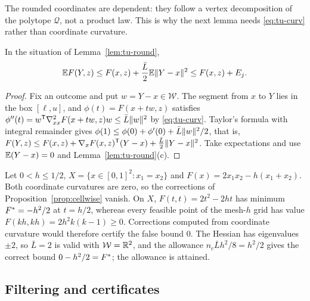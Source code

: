 The rounded coordinates are dependent: they follow a vertex decomposition of
the polytope $\mathcal Q$, not a product law. This is why the next lemma needs
\eqref{eq:tu-curv} rather than coordinate curvature.

\begin{lemma}\label{lem:tu-allow}
In the situation of Lemma~\ref{lem:tu-round},
\[
\mathbb E F(Y,z)\le F(x,z)+\frac{\bar L}2\mathbb E\lVert Y-x\rVert^2\le F(x,z)+E_j .
\]
\end{lemma}

\begin{proof}
Fix an outcome and put $w=Y-x\in\mathcal W$. The segment from $x$ to $Y$ lies
in the box $[\ell,u]$, and $\phi(t)=F(x+tw,z)$ satisfies
$\phi''(t)=w^{\mathsf T}\nabla^2_{xx}F(x+tw,z)w\le\bar L\lVert w\rVert^2$ by
\eqref{eq:tu-curv}. Taylor's formula with integral remainder gives
$\phi(1)\le\phi(0)+\phi'(0)+\bar L\lVert w\rVert^2/2$, that is,
$F(Y,z)\le F(x,z)+\nabla_xF(x,z)^{\mathsf T}(Y-x)+\frac{\bar L}2\lVert Y-x\rVert^2$.
Take expectations and use $\mathbb E(Y-x)=0$ and Lemma~\ref{lem:tu-round}(c).
\end{proof}

\begin{example}\label{ex:tu-fullcurv}
Let $0<h\le1/2$, $X=\{x\in[0,1]^2:x_1=x_2\}$ and
$F(x)=2x_1x_2-h(x_1+x_2)$. Both coordinate curvatures are zero, so the
corrections of Proposition~\ref{prop:cellwise} vanish. On $X$,
$F(t,t)=2t^2-2ht$ has minimum $F^{*}=-h^2/2$ at $t=h/2$, whereas every feasible
point of the mesh-$h$ grid has value $F(kh,kh)=2h^2k(k-1)\ge0$. Corrections
computed from coordinate curvature would therefore certify the false bound
$0$. The Hessian has eigenvalues $\pm2$, so $\bar L=2$ is valid with
$\mathcal W=\mathbb R^2$, and the allowance $n_c\bar Lh^2/8=h^2/2$ gives the correct
bound $0-h^2/2=F^{*}$; the allowance is attained.
\end{example}

\subsection{Filtering and certificates}\label{sec:tu-filter}

